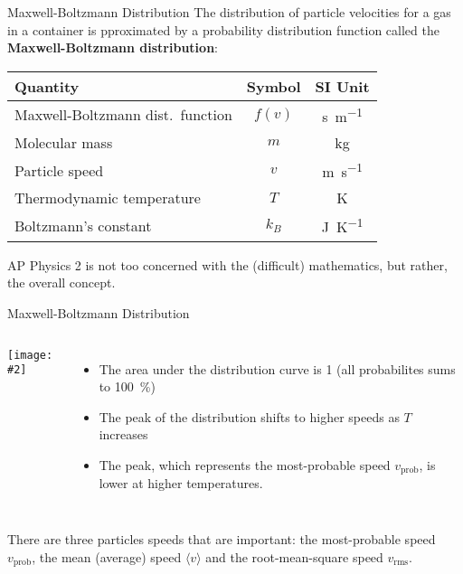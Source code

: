 \documentclass[12pt,aspectratio=169]{beamer}
\newcommand{\pic}[2]{
  \begin{center}
    \texttt{[image: \#2]}
  \end{center}
}
\newcommand{\eq}[2]{\vspace{#1}{\Large\begin{displaymath}#2\end{displaymath}}}
\begin{document}
\begin{frame}{Maxwell-Boltzmann Distribution}
  The distribution of particle velocities for a gas in a container is
  pproximated by a probability distribution function called the
  \textbf{Maxwell-Boltzmann distribution}:

  \eq{-.2in}{
    f(v)=4\pi\left[\frac{m}{2\pi k_BT}\right]^{\frac{3}{2}}v^2
    \exp\left[-\frac{mv^2}{2k_BT}\right]
  }

  \begin{center}
    \begin{tabular}{l|c|c}
      \rowcolor{pink}
      \textbf{Quantity} & \textbf{Symbol} & \textbf{SI Unit} \\ \hline
      Maxwell-Boltzmann dist.\ function & $f(v)$ &\si{\second\per\metre}\\
      Molecular mass            & $m$        & \si{\kilo\gram} \\
      Particle speed            & $v$        & \si{\metre\per\second} \\
      Thermodynamic temperature & $T$        & \si{\kelvin} \\
      Boltzmann's constant      & $k_B$      & \si{\joule\per\kelvin}
    \end{tabular}
  \end{center}
  AP Physics 2 is not too concerned with the (difficult) mathematics,
  but rather, the overall concept.
\end{frame}



\begin{frame}{Maxwell-Boltzmann Distribution}
  \vspace{.15in}\begin{columns}
    \pic{1.05}{maxwell-boltzmann}
    
    \begin{itemize}
    \item The area under the distribution curve is 1 (all probabilites sums to
      \SI{100}{\percent})
    \item The peak of the distribution shifts to higher speeds as $T$ increases
    \item The peak, which represents the most-probable speed $v_\mathrm{prob}$,
      is lower at higher temperatures.
    \end{itemize}
  \end{columns}
  \vspace{.2in}There are three particles speeds that are important: the
  most-probable speed $v_\mathrm{prob}$, the mean (average) speed
  $\langle v \rangle$ and the root-mean-square speed $v_\mathrm{rms}$.
\end{frame}
\end{document}
